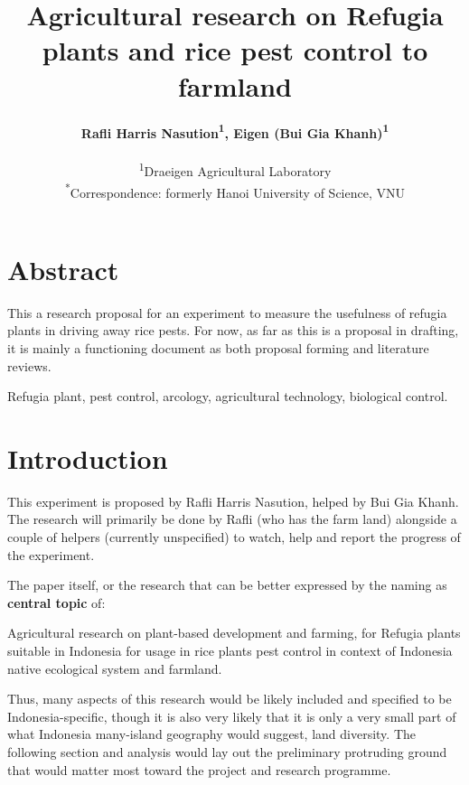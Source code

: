 \documentclass[twocolumn,letterpaper, 12pt]{article}
\title{Agricultural research on Refugia plants and rice pest control to farmland}
\author{%
\textbf{Rafli Harris Nasution{\textsuperscript{1}}, %
Eigen (Bui Gia Khanh){\textsuperscript{1}}} %
\\
\begin{small}
{\textsuperscript{1}}Draeigen Agricultural Laboratory \\ 
{\textsuperscript{*}}Correspondence: {formerly Hanoi University of Science, VNU} \\ 
\end{small}
}
\date{}
\begin{document}
\maketitle
\section*{Abstract}
This a research proposal for an experiment to measure the usefulness of refugia plants in driving away rice pests. For now, as far as this is a proposal in drafting, it is mainly a functioning document as both proposal forming and literature reviews. 
\begin{EPAKeywords}
Refugia plant, pest control, arcology, agricultural technology, biological control. 
\end{EPAKeywords}
%
\section{Introduction}

This experiment is proposed by Rafli Harris Nasution, helped by Bui Gia Khanh. The research will primarily be done by Rafli (who has the farm land) alongside a couple of helpers (currently unspecified) to watch, help and report the progress of the experiment.

The paper itself, or the research that can be better expressed by the naming as \textbf{central topic} of: 
\begin{displayquote}
    Agricultural research on plant-based development and farming, for Refugia plants suitable in Indonesia for usage in rice plants pest control in context of Indonesia native ecological system and farmland. 
\end{displayquote}
Thus, many aspects of this research would be likely included and specified to be Indonesia-specific, though it is also very likely that it is only a very small part of what Indonesia many-island geography would suggest, land diversity. The following section and analysis would lay out the preliminary protruding ground that would matter most toward the project and research programme. 
\end{document}
